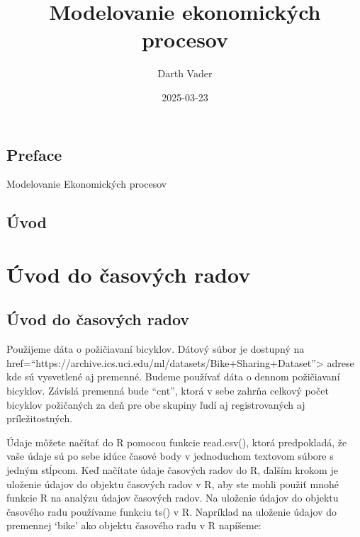 \documentclass[
  letterpaper,
  DIV=11,
  numbers=noendperiod]{scrreprt}
\title{Modelovanie ekonomických procesov}
\author{Darth Vader}
\date{2025-03-23}
\renewcommand*\contentsname{Table of contents}
\newcommand\contentsname{Table of contents}
\begin{document}
\maketitle

\renewcommand*\contentsname{Table of contents}
{
\hypersetup{linkcolor=}
\setcounter{tocdepth}{2}
\tableofcontents
}


\chapter*{Preface}\label{preface}


Modelovanie Ekonomických procesov


\chapter*{Úvod}\label{uxfavod}


\part{Úvod do časových radov}

\chapter{Úvod do časových
radov}\label{uxfavod-do-ux10dasovuxfdch-radov-1}

Použijeme dáta o požičiavaní bicyklov. Dátový súbor je dostupný na
href=``https://archive.ics.uci.edu/ml/datasets/Bike+Sharing+Dataset''\textgreater{}
adrese kde sú vysvetlené aj premenné. Budeme používať dáta o dennom
požičiavaní bicyklov. Závislá premenná bude ``cnt'', ktorá v sebe zahrňa
celkový počet bicyklov požičaných za deň pre obe skupiny ľudí aj
registrovaných aj príležitostných.

Údaje môžete načítať do R pomocou funkcie read.csv(), ktorá predpokladá,
že vaše údaje sú po sebe idúce časové body v jednoduchom textovom súbore
s jedným stĺpcom. Keď načítate údaje časových radov do R, ďalším krokom
je uloženie údajov do objektu časových radov v R, aby ste mohli použiť
mnohé funkcie R na analýzu údajov časových radov. Na uloženie údajov do
objektu časového radu používame funkciu ts() v R. Napríklad na uloženie
údajov do premennej `bike' ako objektu časového radu v R napíšeme:
\end{document}
